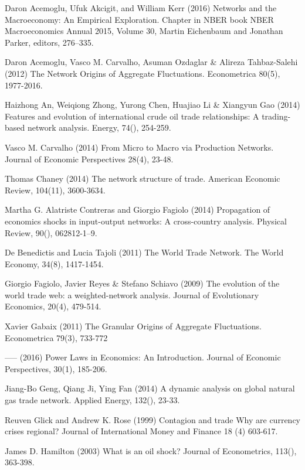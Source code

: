 \documentclass[10pt,letterpaper]{article}
\begin{document}
\begin{thebibliography}{9}
Daron Acemoglu, Ufuk Akcigit, and William Kerr (2016)
Networks and the Macroeconomy: An Empirical Exploration. 
Chapter in NBER book NBER Macroeconomics Annual 2015, Volume 30, Martin Eichenbaum and Jonathan Parker, editors, 276--335.

Daron Acemoglu, Vasco M. Carvalho, Asuman Ozdaglar \& Alireza Tahbaz-Salehi (2012) The Network Origins of Aggregate Fluctuations. Econometrica 80(5), 1977-2016.

Haizhong An, Weiqiong Zhong, Yurong Chen, Huajiao Li \& Xiangyun Gao (2014) Features and evolution of international crude oil trade relationships: A trading-based network analysis. Energy, 74(), 254-259. 

Vasco M. Carvalho (2014) From Micro to Macro via Production Networks. Journal of Economic Perspectives 28(4), 23-48.

Thomas Chaney (2014) The network structure of trade. American Economic Review, 104(11), 3600-3634.

Martha G. Alatriste Contreras and Giorgio Fagiolo (2014) Propagation of economics shocks in input-output networks: A cross-country analysis. Physical Review, 90(), 062812-1--9. 

De Benedictis and Lucia Tajoli (2011) The World Trade Network. The World Economy, 34(8), 1417-1454.  

Giorgio Fagiolo, Javier Reyes \& Stefano Schiavo (2009) The evolution of the world trade web: a weighted-network analysis. Journal of Evolutionary Economics, 20(4), 479-514.

Xavier Gabaix (2011) The Granular Origins of Aggregate Fluctuations. Econometrica 79(3), 733-772

----- (2016) Power Laws in Economics: An Introduction. Journal of Economic Perspectives, 30(1), 185-206.

Jiang-Bo Geng, Qiang Ji, Ying Fan (2014) A dynamic analysis on global natural gas trade network. Applied Energy, 132(), 23-33.

Reuven Glick and Andrew K. Rose (1999) Contagion and trade Why are currency crises regional? Journal of International Money and Finance 18 (4) 603-617.

James D. Hamilton (2003) What is an oil shock? Journal of Econometrics, 113(), 363-398.


\end{thebibliography}
\end{document}
